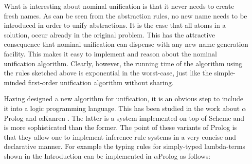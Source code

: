 \begin{isabellebody}
\begin{isamarkuptext}
  \begin{center}
  \end{center}

  \noindent
  What is interesting about nominal unification is that it never needs to
  create fresh names. As can be seen from the abstraction rules, no new name needs
  to be introduced in order to unify abstractions. It is the case that all atoms
  in a solution, occur already in the original problem. This has the attractive 
  consequence that nominal unification can dispense with any new-name-generation
  facility. This makes it easy to implement and reason about the nominal
  unification algorithm. Clearly, however, the running time of the algorithm using the
  rules sketched above is exponential in the worst-case, just like the
  simple-minded first-order unification algorithm without sharing.\end{isamarkuptext}\isamarkuptrue {}
\isamarkuptrue \begin{isamarkuptext}Having designed a new algorithm for unification, it is an obvious step to include it into 
  a logic programming language. This has been studied in the work about 
  $\alpha$Prolog \cite{CheneyUrban04} and
  $\alpha$Kanren \cite{ByrdFriedman07}. The latter is a system implemented on top of
  Scheme and is more sophisticated than the former.
  The point of these variants of Prolog is that
  they allow one to implement inference rule systems in a very concise and declarative
  manner. For example the typing rules for simply-typed lambda-terms shown in the
  Introduction can be implemented
  in $\alpha$Prolog as follows:


\end{isamarkuptext}
\end{isabellebody}
